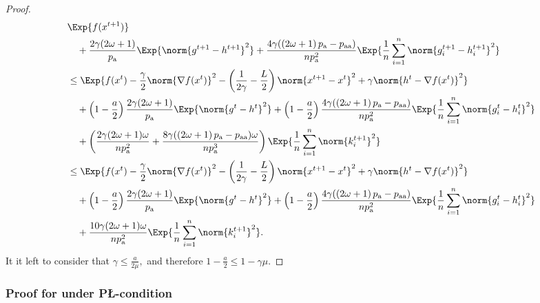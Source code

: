 \documentclass{article}
\newcommand{\algorithmname}{DASHA-PP}
\newcommand*{\probavailable}{\ensuremath{p_{\textnormal{a}}}}
\newcommand*{\probpairaa}{\ensuremath{p_{\textnormal{aa}}}}
\begin{document}
\begin{proof}
  \begin{align*}
    &\Exp{f(x^{t + 1})} \\
    &\quad  + \frac{2\gamma (2\omega + 1)}{\probavailable} \Exp{\norm{g^{t+1} - h^{t+1}}^2} + \frac{4 \gamma (\left(2 \omega + 1\right)\probavailable - \probpairaa)}{n \probavailable^2} \Exp{\frac{1}{n}\sum_{i=1}^n\norm{g^{t+1}_i - h^{t+1}_i}^2}\\
    &\leq \Exp{f(x^t) - \frac{\gamma}{2}\norm{\nabla f(x^t)}^2 - \left(\frac{1}{2\gamma} - \frac{L}{2}\right)
    \norm{x^{t+1} - x^t}^2 + \gamma \norm{h^{t} - \nabla f(x^t)}^2}\nonumber\\
    &\quad + \left(1 - \frac{a}{2}\right)\frac{2\gamma(2\omega + 1)}{\probavailable}\Exp{\norm{g^{t} - h^t}^2} + \left(1 - \frac{a}{2}\right)\frac{4 \gamma (\left(2 \omega + 1\right)\probavailable - \probpairaa)}{n \probavailable^2}\Exp{\frac{1}{n} \sum_{i=1}^n\norm{g^t_i - h^{t}_i}^2}\nonumber\\
    &\quad + \left(\frac{2 \gamma (2 \omega + 1)\omega}{n \probavailable^2} + \frac{8 \gamma (\left(2 \omega + 1\right)\probavailable - \probpairaa) \omega}{n \probavailable^3}\right)\Exp{\frac{1}{n} \sum_{i=1}^n\norm{k^{t+1}_i}^2} \\
    &\leq \Exp{f(x^t) - \frac{\gamma}{2}\norm{\nabla f(x^t)}^2 - \left(\frac{1}{2\gamma} - \frac{L}{2}\right)
    \norm{x^{t+1} - x^t}^2 + \gamma \norm{h^{t} - \nabla f(x^t)}^2}\nonumber\\
    &\quad + \left(1 - \frac{a}{2}\right)\frac{2\gamma(2\omega + 1)}{\probavailable}\Exp{\norm{g^{t} - h^t}^2} + \left(1 - \frac{a}{2}\right)\frac{4 \gamma (\left(2 \omega + 1\right)\probavailable - \probpairaa)}{n \probavailable^2}\Exp{\frac{1}{n} \sum_{i=1}^n\norm{g^t_i - h^{t}_i}^2}\nonumber\\
    &\quad + \frac{10 \gamma (2 \omega + 1)\omega}{n \probavailable^2}\Exp{\frac{1}{n} \sum_{i=1}^n\norm{k^{t+1}_i}^2}.
  \end{align*}
  It it left to consider that $\gamma \leq \frac{a}{2\mu},$ and therefore $1 - \frac{a}{2} \leq 1 - \gamma \mu.$
\end{proof}

\subsubsection{Proof for \algname{\algorithmname} under P\L-condition}

\CONVERGENCEPL*
\end{document}
